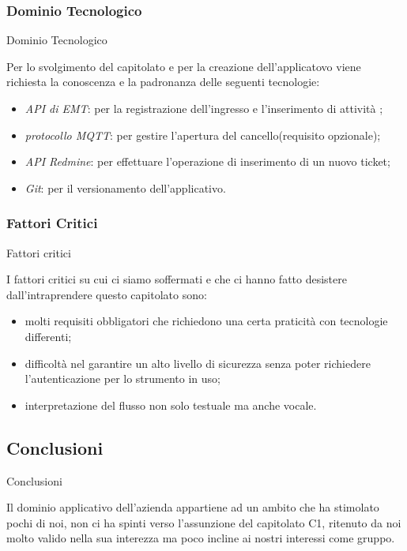 \documentclass[11pt]{article}
\begin{document}
        \subsubsection{Dominio Tecnologico} Dominio Tecnologico
        
        Per lo svolgimento del capitolato e per la creazione dell'applicatovo viene richiesta la conoscenza e la padronanza delle seguenti tecnologie:
        \begin{itemize}
            \item \textit{API  di EMT}: per la registrazione  dell’ingresso e l’inserimento di attività ;
            \item \textit{protocollo MQTT}: per gestire l’apertura del cancello(requisito opzionale);
            \item \textit{API Redmine}: per effettuare l’operazione di inserimento  di un nuovo ticket;
            \item \textit{Git}: per il versionamento dell'applicativo.
        \end{itemize}
    
    \subsubsection{Fattori Critici} Fattori critici
    
    I fattori critici su cui ci siamo soffermati e che ci hanno fatto desistere dall'intraprendere questo capitolato sono:
    \begin{itemize}
            \item molti requisiti obbligatori che richiedono una certa praticità con tecnologie differenti;
            \item difficoltà nel garantire un alto livello di sicurezza senza poter richiedere l’autenticazione per lo strumento in uso;
            \item interpretazione del flusso non solo testuale ma anche vocale.
        \end{itemize}
    \subsection{Conclusioni} Conclusioni
    
    Il dominio applicativo dell'azienda appartiene ad un ambito che ha stimolato pochi di noi, non ci ha spinti verso l'assunzione del capitolato C1, ritenuto da noi molto valido nella sua interezza ma poco incline ai nostri interessi come gruppo.
    
\end{document}
